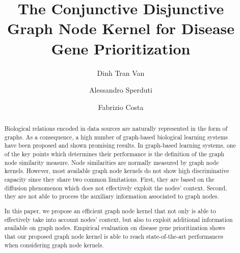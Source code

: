 \documentclass[review]{elsarticle}
\begin{document}
\begin{frontmatter}

\title{The Conjunctive Disjunctive Graph Node Kernel for Disease Gene Prioritization}

\author{Dinh Tran Van}
\author{Alessandro Sperduti}
\address{Department of Mathematics, Padova University, Trieste, 63, 35121 Padova, Italy}
\author{Fabrizio Costa}
\address{Department of Computer Science, University of Exeter Exeter EX4 4QF, UK}




\begin{abstract}
Biological relations encoded in data sources are naturally represented in the form of graphs. As a consequence, a high number of graph-based biological learning systems have been proposed and shown promising results. In graph-based learning systems, one of the key points which determines their performance is the definition of the graph node similarity measure. Node similarities are normally measured by graph node kernels. However, most available graph node kernels do not show high discriminative capacity since they share two common limitations. First, they are based on the diffusion phenomenon which does not effectively exploit the nodes' context. Second, they are not able to process the auxiliary information associated to graph nodes.

In this paper, we propose an efficient graph node kernel that not only is able to effectively take into account nodes' context, but also to  exploit additional information  available on graph nodes. Empirical evaluation on disease gene prioritization shows that our proposed graph node kernel is able to reach  state-of-the-art performances when considering graph node kernels.

\end{abstract}


\end{frontmatter}
\end{document}
